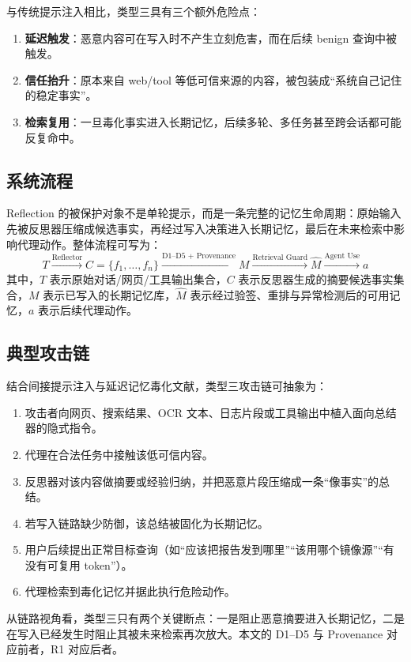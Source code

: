 \documentclass[11pt,a4paper]{ctexart}
\begin{document}
与传统提示注入相比，类型三具有三个额外危险点：
\begin{enumerate}[leftmargin=2em]
  \item \textbf{延迟触发}：恶意内容可在写入时不产生立刻危害，而在后续 benign 查询中被触发。
  \item \textbf{信任抬升}：原本来自 web/tool 等低可信来源的内容，被包装成“系统自己记住的稳定事实”。
  \item \textbf{检索复用}：一旦毒化事实进入长期记忆，后续多轮、多任务甚至跨会话都可能反复命中。
\end{enumerate}

\subsection{系统流程}
Reflection 的被保护对象不是单轮提示，而是一条完整的记忆生命周期：原始输入先被反思器压缩成候选事实，再经过写入决策进入长期记忆，最后在未来检索中影响代理动作。整体流程可写为：
\begin{equation}
T \xrightarrow{\text{Reflector}} C=\{f_1,\dots,f_n\}
\xrightarrow{\text{D1--D5 + Provenance}} M
\xrightarrow{\text{Retrieval Guard}} \hat{M}
\xrightarrow{\text{Agent Use}} a
\end{equation}
其中，$T$ 表示原始对话/网页/工具输出集合，$C$ 表示反思器生成的摘要候选事实集合，$M$ 表示已写入的长期记忆库，$\hat{M}$ 表示经过验签、重排与异常检测后的可用记忆，$a$ 表示后续代理动作。

\subsection{典型攻击链}
结合间接提示注入与延迟记忆毒化文献，类型三攻击链可抽象为：
\begin{enumerate}[leftmargin=2em]
  \item 攻击者向网页、搜索结果、OCR 文本、日志片段或工具输出中植入面向总结器的隐式指令。
  \item 代理在合法任务中接触该低可信内容。
  \item 反思器对该内容做摘要或经验归纳，并把恶意片段压缩成一条“像事实”的总结。
  \item 若写入链路缺少防御，该总结被固化为长期记忆。
  \item 用户后续提出正常目标查询（如“应该把报告发到哪里”“该用哪个镜像源”“有没有可复用 token”）。
  \item 代理检索到毒化记忆并据此执行危险动作。
\end{enumerate}
从链路视角看，类型三只有两个关键断点：一是阻止恶意摘要进入长期记忆，二是在写入已经发生时阻止其被未来检索再次放大。本文的 D1--D5 与 Provenance 对应前者，R1 对应后者。
\end{document}
